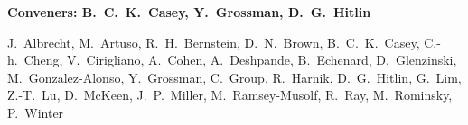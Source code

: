 

\begin{center}

\begin{large} {\bf Conveners: B.~C.~K.~Casey, Y.~Grossman, D.~G.~Hitlin} \end{large}

J.~Albrecht,
M.~Artuso,
R.~H.~Bernstein,
D.~N.~Brown,
B.~C.~K.~Casey,
C.-h.~Cheng,
V.~Cirigliano,
A.~Cohen,
A.~Deshpande,
B.~Echenard,
D.~Glenzinski,
M.~Gonzalez-Alonso,
Y.~Grossman,
C.~Group,
R.~Harnik,
D.~G.~Hitlin, 
G.~Lim,
Z.-T.~Lu,
D.~McKeen,
J.~P.~Miller,
M.~Ramsey-Musolf,
R.~Ray,
M.~Rominsky,
P.~Winter 


\end{center}

